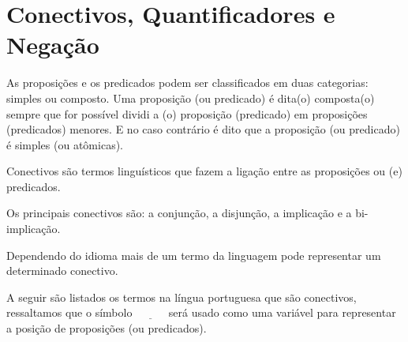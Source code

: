 \section{Conectivos, Quantificadores e Negação}\label{sec:Conectivo-Quantificador-Negacao}

As proposições e os predicados podem ser classificados em duas categorias: simples ou composto. Uma proposição (ou predicado) é dita(o) composta(o) sempre que for possível dividi a (o) proposição (predicado) em proposições (predicados) menores. E no caso contrário é dito que a proposição (ou predicado) é simples (ou atômicas).

\begin{definition}[Conectivos]\label{def:Conectivos}
	Conectivos são termos linguísticos que fazem a ligação entre as proposições ou (e) predicados.
\end{definition}

Os principais conectivos são: a conjunção, a disjunção, a implicação e a bi-implicação.

\begin{remark}
    Dependendo do idioma mais de um termo da linguagem pode representar um determinado conectivo.
\end{remark}

A seguir são listados os termos na língua portuguesa que são conectivos, ressaltamos que o símbolo $\underline{ \ \ \ \ \ \ \ \ \ \ \ \ }$ será usado como uma variável para representar a posição de proposições (ou predicados).

